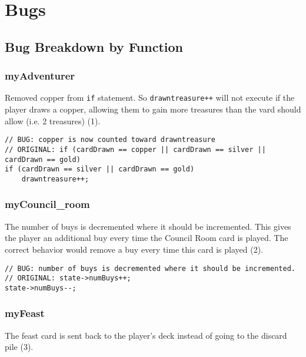 \documentclass[11pt]{article}
\begin{document}
\section{Bugs}
\label{sec:org24710bb}

\subsection{Bug Breakdown by Function}
\label{sec:org546e8b2}

\subsubsection{myAdventurer}
\label{sec:org7268d4d}

Removed copper from \texttt{if} statement. So \texttt{drawntreasure++} will not execute if the player draws a copper, allowing them to gain more treasures than the vard should allow (i.e. 2 treasures) (1).

\begin{verbatim}
// BUG: copper is now counted toward drawntreasure
// ORIGINAL: if (cardDrawn == copper || cardDrawn == silver || cardDrawn == gold)
if (cardDrawn == silver || cardDrawn == gold)
    drawntreasure++;
\end{verbatim}

\subsubsection{myCouncil\_room}
\label{sec:org79f919e}

The number of buys is decremented where it should be incremented. This gives the player an additional buy every time the Council Room card is played. The correct behavior would remove a buy every time this card is played (2).

\begin{verbatim}
// BUG: number of buys is decremented where it should be incremented.
// ORIGINAL: state->numBuys++;
state->numBuys--;
\end{verbatim}

\subsubsection{myFeast}
\label{sec:org70bf80e}

The feast card is sent back to the player's deck instead of going to the discard pile (3).
\end{document}
